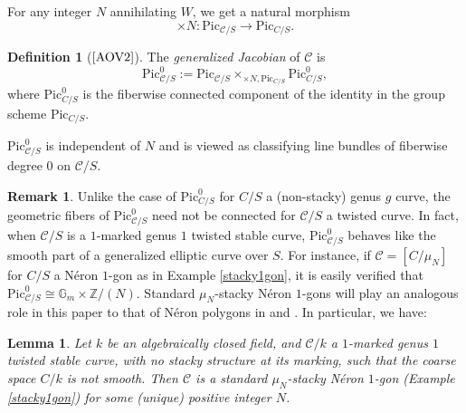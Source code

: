 \documentclass[11pt]{amsart}
\newtheorem{lemma}[subsection]{Lemma}
\theoremstyle{definition}
\newtheorem{definition}[subsection]{Definition}
\newtheorem{remark}[subsection]{Remark}
\begin{document}
For any integer $N$ annihilating $W$, we get a natural morphism 
\begin{displaymath}
\times N: \mathrm{Pic}_{{\mathcal{C}}/S} \rightarrow \mathrm{Pic}_{C/S}.
\end{displaymath}

\begin{definition}[$\textrm{\cite[2.11]{AOV2}}$]
The \textit{generalized Jacobian} of ${\mathcal{C}}$ is 
\begin{displaymath}
\mathrm{Pic}^0_{{\mathcal{C}}/S} := \mathrm{Pic}_{{\mathcal{C}}/S} \times_{ \times N, \mathrm{Pic}_{C/S}} \mathrm{Pic}^0_{C/S}, 
\end{displaymath}
where $\mathrm{Pic}^0_{C/S}$ is the fiberwise connected component of the identity in the group scheme $\mathrm{Pic}_{C/S}$.
\end{definition}

$\mathrm{Pic}^0_{{\mathcal{C}}/S}$ is independent of $N$ and is viewed as classifying line bundles of fiberwise degree $0$ on ${\mathcal{C}}/S$.

\begin{remark}
Unlike the case of $\mathrm{Pic}^0_{C/S}$ for $C/S$ a (non-stacky) genus $g$ curve, the geometric fibers of $\mathrm{Pic}^0_{{\mathcal{C}}/S}$ need not be connected for ${\mathcal{C}}/S$ a twisted curve. In fact, when ${\mathcal{C}}/S$ is a $1$-marked genus $1$ twisted stable curve, $\mathrm{Pic}^0_{{\mathcal{C}}/S}$ behaves like the smooth part of a generalized elliptic curve over $S$. For instance, if ${\mathcal{C}} = [C/\mu_N]$ for $C/S$ a N\'eron $1$-gon as in Example \ref{stacky1gon}, it is easily verified that $\mathrm{Pic}^0_{{\mathcal{C}}/S} \cong \mathbb{G}_m \times \mathbb{Z}/(N)$. Standard $\mu_N$-stacky N\'eron $1$-gons will play an analogous role in this paper to that of N\'eron polygons in \cite{DR} and \cite{C}. In particular, we have:
\end{remark}

\begin{lemma}\label{singulartwistedcurves}
Let $k$ be an algebraically closed field, and ${\mathcal{C}}/k$ a $1$-marked genus $1$ twisted stable curve, with no stacky structure at its marking, such that the coarse space $C/k$ is not smooth. Then ${\mathcal{C}}$ is a standard $\mu_N$-stacky N\'eron $1$-gon (Example \ref{stacky1gon}) for some (unique) positive integer $N$.
\end{lemma}
\end{document}
